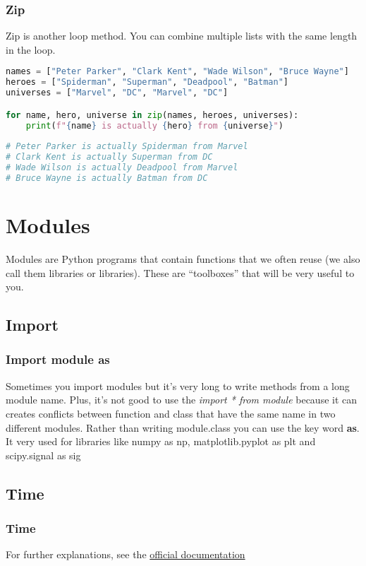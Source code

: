 \documentclass[a4paper, 12pt, titlepage]{scrartcl} %
\begin{document}
\subsubsection{Zip}
Zip is another loop method. You can combine multiple lists with the same length in the loop. 
\begin{lstlisting}[language=Python]
names = ["Peter Parker", "Clark Kent", "Wade Wilson", "Bruce Wayne"]
heroes = ["Spiderman", "Superman", "Deadpool", "Batman"]
universes = ["Marvel", "DC", "Marvel", "DC"]

for name, hero, universe in zip(names, heroes, universes):
	print(f"{name} is actually {hero} from {universe}")
	
# Peter Parker is actually Spiderman from Marvel
# Clark Kent is actually Superman from DC
# Wade Wilson is actually Deadpool from Marvel
# Bruce Wayne is actually Batman from DC
\end{lstlisting} \vspace{5mm}


\newpage
\section{Modules}
Modules are Python programs that contain functions that we often reuse (we also call them libraries or libraries). These are “toolboxes” that will be very useful to you.

\subsection{Import}
\label{subsec:Import}

\subsubsection{Import module as}
\label{As}
Sometimes you import modules but it's very long to write methods from a long module name. Plus, it's not good to use the \textit{import * from module} because it can creates conflicts between function and class that have the same name in two different modules. Rather than writing module.class you can use the key word \textbf{as}. It very used for libraries like numpy as np, matplotlib.pyplot as plt and scipy.signal as sig


\subsection{Time}
\subsubsection{Time}
For further explanations, see the \href{https://docs.python.org/3/library/time.html}{official documentation}
\end{document}
